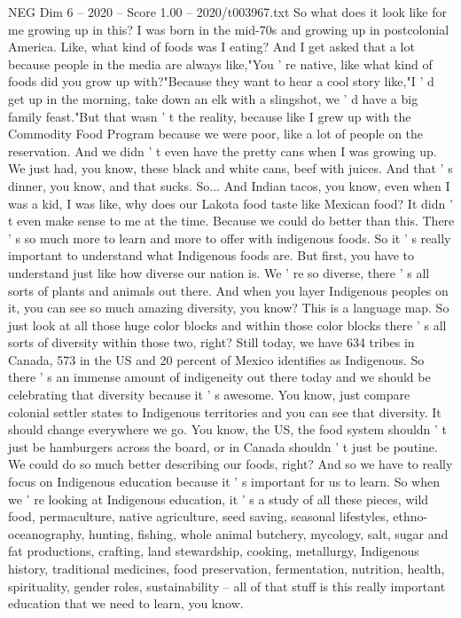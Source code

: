 \begin{textsample}{NEG Dim 6 – 2020 – Score 1.00 – 2020/t003967.txt}
So what does it look like for me growing up in this?
I was born in the mid-70s and growing up in postcolonial America.
Like, what kind of foods was I eating?
And I get asked that a lot because people in the media are always like,"You ' re native, like what kind of foods did you grow up with?"Because they want to hear a cool story like,"I ' d get up in the morning, take down an elk with a slingshot, we ' d have a big family feast."But that wasn ' t the reality, because like I grew up with the Commodity Food Program because we were poor, like a lot of people on the reservation.
And we didn ' t even have the pretty cans when I was growing up.
We just had, you know, these black and white cans, beef with juices.
And that ' s dinner, you know, and that sucks.
So...
And Indian tacos, you know, even when I was a kid, I was like, why does our Lakota food taste like Mexican food?
It didn ' t even make sense to me at the time.
Because we could do better than this.
There ' s so much more to learn and more to offer with indigenous foods.
So it ' s really important to understand what Indigenous foods are.
But first, you have to understand just like how diverse our nation is.
We ' re so diverse, there ' s all sorts of plants and animals out there.
And when you layer Indigenous peoples on it, you can see so much amazing diversity, you know?
This is a language map.
So just look at all those huge color blocks and within those color blocks there ' s all sorts of diversity within those two, right?
Still today, we have 634 tribes in Canada, 573 in the US and 20 percent of Mexico identifies as Indigenous.
So there ' s an immense amount of indigeneity out there today and we should be celebrating that diversity because it ' s awesome.
You know, just compare colonial settler states to Indigenous territories and you can see that diversity.
It should change everywhere we go.
You know, the US, the food system shouldn ' t just be hamburgers across the board, or in Canada shouldn ' t just be poutine.
We could do so much better describing our foods, right?
And so we have to really focus on Indigenous education because it ' s important for us to learn.
So when we ' re looking at Indigenous education, it ' s a study of all these pieces, wild food, permaculture, native agriculture, seed saving, seasonal lifestyles, ethno-oceanography, hunting, fishing, whole animal butchery, mycology, salt, sugar and fat productions, crafting, land stewardship, cooking, metallurgy, Indigenous history, traditional medicines, food preservation, fermentation, nutrition, health, spirituality, gender roles, sustainability -- all of that stuff is this really important education that we need to learn, you know.

\end{textsample}
